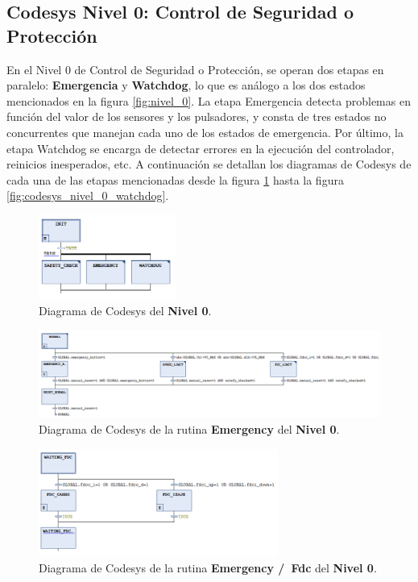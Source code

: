 \documentclass[11pt]{article}
\begin{document}
\subsection{Codesys Nivel 0: Control de Seguridad o Protección}

En el Nivel 0 de Control de Seguridad o Protección, se operan dos etapas en paralelo: \textbf{Emergencia} y \textbf{Watchdog}, lo que es análogo a los dos estados mencionados en la figura \ref{fig:nivel_0}. La etapa Emergencia detecta problemas en función del valor de los sensores y los pulsadores, y consta de tres estados no concurrentes que manejan cada uno de los estados de emergencia. Por último, la etapa Watchdog se encarga de detectar errores en la ejecución del controlador, reinicios inesperados, etc. A continuación se detallan los diagramas de Codesys de cada una de las etapas mencionadas desde la figura \ref{fig:codesys_nivel_0} hasta la figura \ref{fig:codesys_nivel_0_watchdog}.

\begin{figure}[!h]
	\centering
	\includegraphics[width=0.4\textwidth]{images/codesys_nivel_0.png}
	\caption{Diagrama de Codesys del \textbf{Nivel 0}.}
	\label{fig:codesys_nivel_0}
\end{figure}

\begin{figure}[!h]
	\centering
	\includegraphics[width=1\textwidth]{images/codesys_nivel_0_emergency.png}
	\caption{Diagrama de Codesys de la rutina \textbf{Emergency} del \textbf{Nivel 0}.}
	\label{fig:codesys_nivel_0_emergency}
\end{figure}

\begin{figure}%
	\centering
	\includegraphics[width=0.7\textwidth]{images/codesys_nivel_0_emergency_fdc.png}
	\caption{Diagrama de Codesys de la rutina \textbf{Emergency /\ Fdc} del \textbf{Nivel 0}.}
	\label{fig:codesys_nivel_0_emergency_fdc}
\end{figure}
\end{document}

